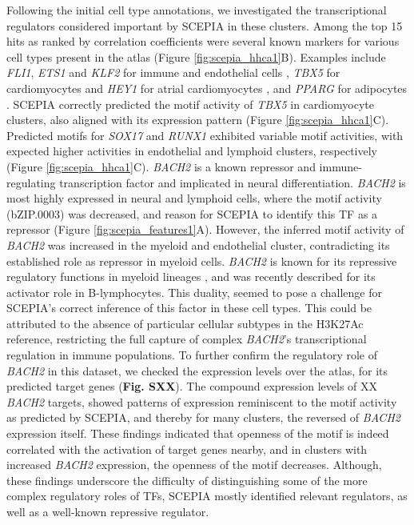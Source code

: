 Following the initial cell type annotations, we investigated the transcriptional regulators considered important by SCEPIA in these clusters. Among the top 15 hits as ranked by correlation coefficients were several known markers for various cell types present in the atlas (Figure \ref{fig:scepia_hhca1}B). Examples include \textit{FLI1}, \textit{ETS1} and \textit{KLF2} for immune and endothelial cells \cite{Meadows2009,Zhao2018,BenDavid2022}, \textit{TBX5} for cardiomyocytes\cite{Steimle2017,Siatra2023} and \textit{HEY1} for atrial cardiomyocytes \cite{Kokubo2007}, and \textit{PPARG} for adipocytes \cite{Ma2018}. SCEPIA correctly predicted the motif activity of \textit{TBX5} in cardiomyocyte clusters, also aligned with its expression pattern (Figure \ref{fig:scepia_hhca1}C). Predicted motifs for \textit{SOX17} and \textit{RUNX1} exhibited variable motif activities, with expected higher activities in endothelial and lymphoid clusters, respectively \cite{Lee2014,Schachterle2017,Sood2017}(Figure \ref{fig:scepia_hhca1}C). \textit{BACH2} is a known repressor and immune-regulating transcription factor and implicated in neural differentiation\cite{Hoshino2002,Liu2022}. \textit{BACH2} is most highly expressed in neural and lymphoid cells, where the motif activity (bZIP.0003) was decreased, and reason for SCEPIA to identify this TF as a repressor (Figure \ref{fig:scepia_features1}A). However, the inferred motif activity of \textit{BACH2} was increased in the myeloid and endothelial cluster, contradicting its established role as repressor in myeloid cells. \textit{BACH2} is known for its repressive regulatory functions in myeloid lineages \cite{ItohNakadai2014}, and was recently described for its activator role in B-lymphocytes\cite{Ochiai2022}. This duality, seemed to pose a challenge for SCEPIA's correct inference of this factor in these cell types. This could be attributed to the absence of particular cellular subtypes in the H3K27Ac reference, restricting the full capture of complex \textit{BACH2}'s transcriptional regulation in immune populations. To further confirm the regulatory role of \textit{BACH2} in this dataset, we checked the expression levels over the atlas, for its predicted target genes (\textbf{Fig. SXX}). The compound expression levels of XX \textit{BACH2} targets, showed patterns of expression reminiscent to the motif activity as predicted by SCEPIA, and thereby for many clusters, the reversed of \textit{BACH2} expression itself. These findings indicated that openness of the motif is indeed correlated with the activation of target genes nearby, and in clusters with increased \textit{BACH2} expression, the openness of the motif decreases. Although, these findings underscore the difficulty of distinguishing some of the more complex regulatory roles of TFs, SCEPIA mostly identified relevant regulators, as well as a well-known repressive regulator.

